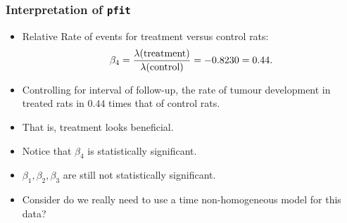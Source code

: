 \documentclass[oneside]{book}\usepackage[]{graphicx}\usepackage[svgnames]{xcolor}
\let\exp\relax%
\begin{document}
\subsubsection*{Interpretation of \texttt{pfit}}
\begin{itemize}
      \item Relative Rate of events for treatment versus control rats:
            \[ \exp{\beta_4}=\frac{\lambda(\text{treatment})}{\lambda(\text{control})}=\exp{-0.8230}=0.44. \]
      \item Controlling for interval of follow-up, the rate of tumour development in treated rats
            in $0.44$ times that of control rats.
      \item That is, treatment looks beneficial.
      \item Notice that $ \beta_4 $ is statistically significant.
      \item $ \beta_1,\beta_2,\beta_3 $ are still not statistically significant.
      \item Consider do we really need to use a time non-homogeneous model for this data?
\end{itemize}
\end{document}
